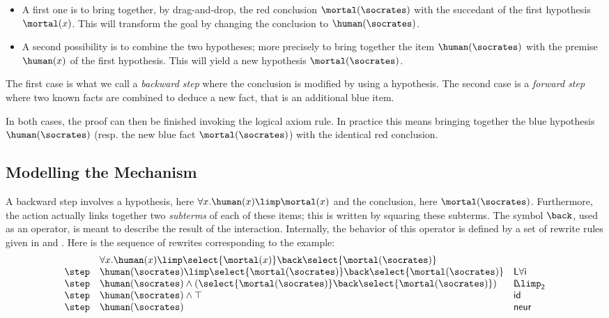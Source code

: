 \begin{itemize}
\item A first one is to bring together, by drag-and-drop, the red conclusion
$\mortal(\socrates)$ with the succedant of the first hypothesis $\mortal(x)$.
This will transform the goal by changing the conclusion to $\human(\socrates)$.
\item A second possibility is to combine the two hypotheses; more precisely to
bring together the item $\human(\socrates)$ with the premise $\human(x)$ of the
first hypothesis. This will yield a new hypothesis $\mortal(\socrates)$.
\end{itemize}

The first case is what we call a {\em backward step} where the conclusion is
modified by using a hypothesis. The second case is a {\em forward step} where
two known facts are combined to deduce a new fact, that is an additional blue
item.

In both cases, the proof can then be finished invoking the logical
axiom rule. In practice this means bringing together the blue
hypothesis $\human(\socrates)$ (resp. the new blue fact
$\mortal(\socrates)$) with the identical red conclusion.


\subsection{Modelling the Mechanism}

A backward step involves a hypothesis, here $\forall x.\-\human(x)
\allowbreak\limp \mortal(x)$ and the conclusion, here $\mortal(\socrates)$.
Furthermore, the action actually links together two {\em subterms} of each of
these items; this is written by squaring these subterms. The symbol ${\back}$,
used as an operator, is meant to describe the result of the interaction.
Internally, the behavior of this operator is defined by a set of rewrite rules
given in  and . Here is the sequence of
rewrites corresponding to the example: \renewcommand{\arraystretch}{1.1}
$$\begin{array}{lll}
    &  \forall x.\human(x)\limp \select{\mortal(x)} \back \select{\mortal(\socrates)}&\\
    \step &
           \human(\socrates)\limp \select{\mortal(\socrates)}
           \back \select{\mortal(\socrates)}&
                                               \mathsf{L\forall i}\\
    \step &
           \human(\socrates)\land(\select{\mortal(\socrates)}
           \back \select{\mortal(\socrates)}) &
                                                 \mathsf{L\!\!\limp_2}\\
    \step &  \human(\socrates)\land \top &
                                           \mathsf{id}\\
    \step & \human(\socrates)&\mathsf{neur}\\
  \end{array}$$

